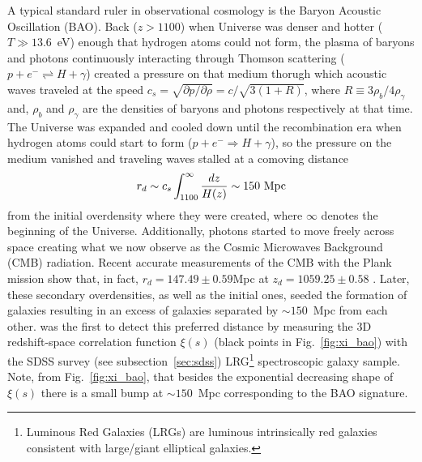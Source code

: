 A typical standard ruler in observational cosmology is the Baryon Acoustic Oscillation (BAO). Back ($z>1100$) when Universe was denser and hotter ($T\gg13.6$~eV) enough that hydrogen atoms could not form, the plasma of baryons and photons continuously interacting through Thomson scattering ($p+e^- \rightleftharpoons H+\gamma$) created a pressure on that medium thorugh which acoustic waves traveled at the speed $c_s = \sqrt{\partial p /\partial \rho}=c/\sqrt{3(1+R)}$, where $R \equiv 3\rho_b / 4\rho_\gamma$ and, $\rho_b$ and $\rho_\gamma$ are the densities of baryons and photons respectively at that time. The Universe was expanded and cooled down until the recombination era when hydrogen atoms could start to form ($p+e^- \Rightarrow H+\gamma$), so the pressure on the medium vanished and traveling waves stalled at a comoving distance
\begin{equation}
r_d \sim c_s \int_{1100}^{\infty} {dz \over H(z)} \sim 150\ \rm Mpc
\end{equation}
from the initial overdensity where they were created, where $\infty$ denotes the beginning of the Universe. Additionally, photons started to move freely across space creating what we now observe as the Cosmic Microwaves Background (CMB) radiation. Recent accurate measurements of the CMB with the Plank mission show that, in fact, $r_d=147.49 \pm 0.59$Mpc at $z_d = 1059.25\pm0.58$ \citep{Ade2013}. Later, these secondary overdensities, as well as the initial ones, seeded the formation of galaxies resulting in an excess of galaxies separated by $\sim150$~Mpc from each other. \citet{Eisenstein2005} was the first to detect this preferred distance by measuring the 3D redshift-space correlation function $\xi(s)$ (black points in Fig.~\ref{fig:xi_bao}) with the SDSS survey (see subsection~\ref{sec:sdss}) LRG\footnote{Luminous Red Galaxies (LRGs) are luminous intrinsically red galaxies consistent with large/giant elliptical galaxies.} spectroscopic galaxy sample. Note, from Fig.~\ref{fig:xi_bao}, that besides the exponential decreasing shape of $\xi(s)$ there is a small bump at $\sim150$~Mpc corresponding to the BAO signature.
